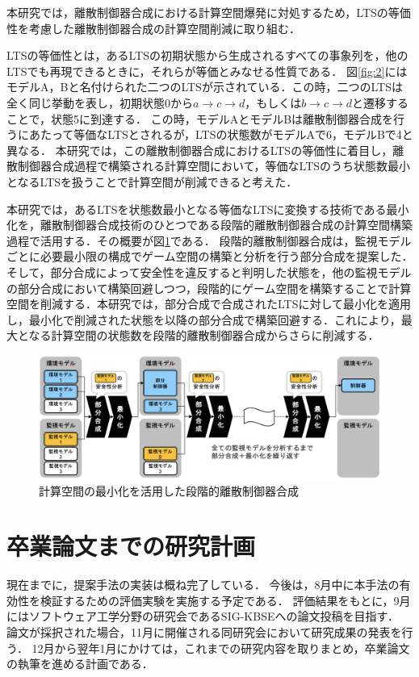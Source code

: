 \documentclass[11pt]{jarticle}
\begin{document}
本研究では，離散制御器合成における計算空間爆発に対処するため，LTSの等価性を考慮した離散制御器合成の計算空間削減に取り組む．

LTSの等価性とは，あるLTSの初期状態から生成されるすべての事象列を，他のLTSでも再現できるときに，それらが等価とみなせる性質である．
図\ref{fig:2}にはモデルA，Bと名付けられた二つのLTSが示されている．この時，二つのLTSは全く同じ挙動を表し，初期状態0から$a \rightarrow c \rightarrow d$，もしくは$b \rightarrow c \rightarrow d$と遷移することで，状態5に到達する．
この時，モデルAとモデルBは離散制御器合成を行うにあたって等価なLTSとされるが，LTSの状態数がモデルAで6，モデルBで4と異なる．
本研究では，この離散制御器合成におけるLTSの等価性に着目し，離散制御器合成過程で構築される計算空間において，等価なLTSのうち状態数最小となるLTSを扱うことで計算空間が削減できると考えた．

本研究では，あるLTSを状態数最小となる等価なLTSに変換する技術である最小化を，離散制御器合成技術のひとつである段階的離散制御器合成\cite{yamauchi}の計算空間構築過程で活用する．その概要が図\ref{fig:3}である．
段階的離散制御器合成\cite{yamauchi}は，監視モデルごとに必要最小限の構成でゲーム空間の構築と分析を行う部分合成を提案した．そして，部分合成によって安全性を違反すると判明した状態を，他の監視モデルの部分合成において構築回避しつつ，段階的にゲーム空間を構築することで計算空間を削減する．本研究では，部分合成で合成されたLTSに対して最小化を適用し，最小化で削減された状態を以降の部分合成で構築回避する．これにより，最大となる計算空間の状態数を段階的離散制御器合成からさらに削減する．

\begin{figure}[h]
  \centering
  \includegraphics[width=14.5cm]{./figures/proposal.png}
  \caption{計算空間の最小化を活用した段階的離散制御器合成}
  \label{fig:3}
\end{figure}


\section{卒業論文までの研究計画}
現在までに，提案手法の実装は概ね完了している．
今後は，8月中に本手法の有効性を検証するための評価実験を実施する予定である．
評価結果をもとに，9月にはソフトウェア工学分野の研究会であるSIG-KBSEへの論文投稿を目指す．
論文が採択された場合，11月に開催される同研究会において研究成果の発表を行う．
12月から翌年1月にかけては，これまでの研究内容を取りまとめ，卒業論文の執筆を進める計画である．
\end{document}

